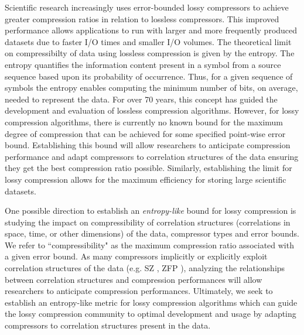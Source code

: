 \documentclass[conference]{IEEEtran}
\begin{document}
Scientific research increasingly uses error-bounded lossy compressors to achieve greater compression ratios in relation to lossless compressors\cite{Cappello2019}. This improved performance allows applications to run with larger and more frequently produced datasets due to faster I/O times and smaller I/O volumes. The theoretical limit on compressibilty of data using lossless compression is given by the entropy\cite{Shannon1948}. The entropy quantifies the information content present in a symbol from a source sequence based upon its probability of occurrence. Thus, for a given sequence of symbols the entropy enables computing the minimum number of bits, on average, needed to represent the data. 
For over 70 years, this concept has guided the development and evaluation of lossless compression algorithms. However, for lossy compression algorithms, there is currently no known bound for the maximum degree of compression that can be achieved for some specified point-wise error bound. Establishing this bound will allow researchers to anticipate compression performance and adapt compressors to correlation structures of the data ensuring they get the best compression ratio possible.
Similarly, establishing the limit for lossy compression allows for the maximum efficiency for storing large scientific datasets. 

One possible direction to establish an \textit{entropy-like} bound for lossy compression is studying the impact on compressibility of correlation structures (correlations in space, time, or other dimensions) of the data, compressor types and error bounds.  
We refer to ``compressibility" as the maximum compression ratio associated with a given error bound. 
As many compressors implicitly or explicitly exploit correlation structures of the data (e.g.  SZ \cite{Liang2018}, 
ZFP \cite{Lindstrom2006}), analyzing the relationships between correlation structures and compression performances will allow researchers to anticipate compression performances. 
Ultimately, we seek to establish an entropy-like metric for lossy compression algorithms which can guide the lossy compression community to optimal development and usage by adapting compressors to correlation structures present in the  data. 
\end{document}
